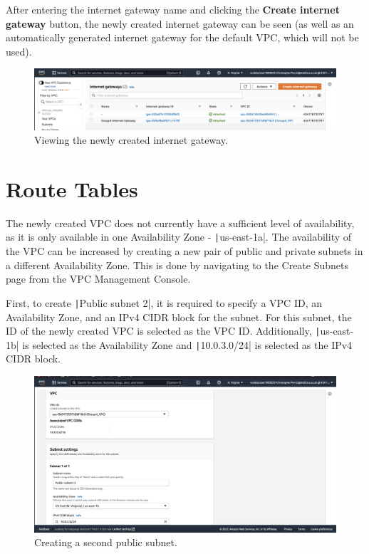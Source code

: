After entering the internet gateway name and clicking the \textbf{Create internet gateway} button, the newly created
internet gateway can be seen (as well as an automatically generated internet gateway for the default VPC, which will not
be used).

\begin{figure}[!htbp]
    \centering
    \includegraphics[width=\textwidth]{resources/vpc/internet-gateway-2}
    \caption{Viewing the newly created internet gateway.}
    \label{fig:internet-gateway-2}
\end{figure}

\clearpage
\section{Route Tables}\label{sec:route-tables}

The newly created VPC does not currently have a sufficient level of availability, as it is only available in one
Availability Zone - \texttt|us-east-1a|.
The availability of the VPC can be increased by creating a new pair of public and private subnets in a different
Availability Zone.
This is done by navigating to the Create Subnets page from the VPC Management Console.

First, to create \texttt|Public subnet 2|, it is required to specify a VPC ID, an Availability Zone, and an
IPv4 CIDR block for the subnet.
For this subnet, the ID of the newly created VPC is selected as the VPC ID\@.
Additionally, \texttt|us-east-1b| is selected as the Availability Zone and
\texttt|10.0.3.0/24| is selected as the IPv4 CIDR block.

\begin{figure}[!htbp]
    \centering
    \includegraphics[width=125mm]{resources/vpc/routes/vpc-public-subnet-2}
    \caption{Creating a second public subnet.}
    \label{fig:vpc-public-subnet-2}
\end{figure}


